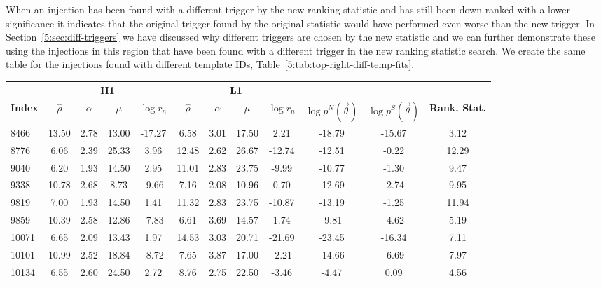 When an injection has been found with a different trigger by the new ranking statistic and has still been down-ranked with a lower significance it indicates that the original trigger found by the original statistic would have performed even worse than the new trigger. In Section~\ref{5:sec:diff-triggers} we have discussed why different triggers are chosen by the new statistic and we can further demonstrate these using the injections in this region that have been found with a different trigger in the new ranking statistic search. We create the same table for the injections found with different template IDs, Table~\ref{5:tab:top-right-diff-temp-fits}.
%
\begin{table}[ht]
    \centering
    \small
    \setlength{\tabcolsep}{4pt}
    \begin{tabular}{lccccccccccc}
        \toprule
        & \multicolumn{4}{c}{\textbf{H1}} & \multicolumn{4}{c}{\textbf{L1}} \\
        \cmidrule(lr){2-5} \cmidrule(lr){6-9}
        \textbf{Index} & \textbf{$\hat{\rho}$} & \textbf{$\alpha$} & \textbf{$\mu$} & \textbf{$\log r_n$} & \textbf{$\hat{\rho}$} & \textbf{$\alpha$} & \textbf{$\mu$} & \textbf{$\log r_n$} & \textbf{$\log p^{N}(\Vec{\theta})$} & \textbf{$\log p^{S}(\Vec{\theta})$} & \textbf{Rank. Stat.} \\
        \midrule
        8466 & 13.50 & 2.78 & 13.00 & -17.27 & 6.58 & 3.01 & 17.50 & 2.21 & -18.79 & -15.67 & 3.12 \\
        8776 & 6.06 & 2.39 & 25.33 & 3.96 & 12.48 & 2.62 & 26.67 & -12.74 & -12.51 & -0.22 & 12.29 \\
        9040 & 6.20 & 1.93 & 14.50 & 2.95 & 11.01 & 2.83 & 23.75 & -9.99 & -10.77 & -1.30 & 9.47 \\
        9338 & 10.78 & 2.68 & 8.73 & -9.66 & 7.16 & 2.08 & 10.96 & 0.70 & -12.69 & -2.74 & 9.95 \\
        9819 & 7.00 & 1.93 & 14.50 & 1.41 & 11.32 & 2.83 & 23.75 & -10.87 & -13.19 & -1.25 & 11.94 \\
        9859 & 10.39 & 2.58 & 12.86 & -7.83 & 6.61 & 3.69 & 14.57 & 1.74 & -9.81 & -4.62 & 5.19 \\
        10071 & 6.65 & 2.09 & 13.43 & 1.97 & 14.53 & 3.03 & 20.71 & -21.69 & -23.45 & -16.34 & 7.11 \\
        10101 & 10.99 & 2.52 & 18.84 & -8.72 & 7.65 & 3.87 & 17.00 & -2.21 & -14.66 & -6.69 & 7.97 \\
        10134 & 6.55 & 2.60 & 24.50 & 2.72 & 8.76 & 2.75 & 22.50 & -3.46 & -4.47 & 0.09 & 4.56 \\

\end{tabular}
\end{table}
